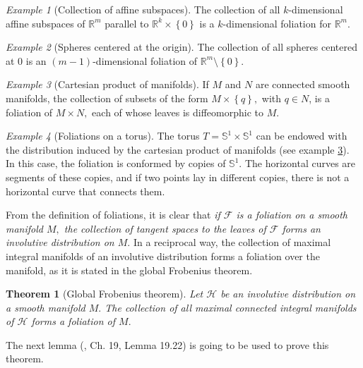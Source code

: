 \documentclass[12pt, letterpaper, reqno]{amsart}
\theoremstyle{definition}
\theoremstyle{plain}
\newtheorem{thm}{Theorem}
\theoremstyle{remark}
\newtheorem{ex}{Example}
\begin{document}
\begin{ex}[Collection of affine subspaces]
	The collection of all $ k $-dimensional affine subspaces of $ \mathbb{R}^m $ parallel to $ \mathbb{R}^k\times \left\{ 0 \right\} $ is a $ k $-dimensional foliation for $ \mathbb{R}^m. $ 
\end{ex}

\begin{ex}[Spheres centered at the origin]
	The collection of all spheres centered at $ 0 $ is an $ (m-1) $-dimensional foliation of $ \mathbb{R}^m\setminus \left\{ 0 \right\} $. 
\end{ex}

\begin{ex}[Cartesian product of manifolds]\label{ex:product_foliation}
	If $ M $ and $ N $ are connected smooth manifolds, the collection of subsets of the form $ M\times \left\{ q \right\}, $ with $ q\in N $, is a foliation of $ M\times N, $ each of whose leaves is diffeomorphic to $ M. $  	
\end{ex}

\begin{ex}[Foliations on a torus]
	The torus $ T= \mathbb{S}^1\times \mathbb{S}^1 $ can be endowed with the distribution induced by the cartesian product of manifolds (see example \ref{ex:product_foliation}). In this case, the foliation is conformed by copies of $ \mathbb{S}^1. $ The horizontal curves are segments of these copies, and if two points lay in different copies, there is not a horizontal curve that connects them.
\end{ex}

From the definition of foliations, it is clear that \textit{if $ \mathcal{F} $ is a foliation on a smooth manifold $ M, $ the collection of tangent spaces to the leaves of $ \mathcal{F} $ forms an involutive distribution on $ M. $} In a reciprocal way, the collection of maximal integral manifolds of an involutive distribution forms a foliation over the manifold, as it is stated in the global Frobenius theorem.

\begin{thm}[Global Frobenius theorem]
	Let $ \mathcal{H} $ be an involutive distribution on a smooth manifold $ M. $ The collection of all maximal connected integral manifolds of $ \mathcal{H} $ forms a foliation of $ M. $ 
\end{thm}

The next lemma (\cite{lee2003introduction}, Ch. 19, Lemma 19.22) is going to be used to prove this theorem.
\end{document}
